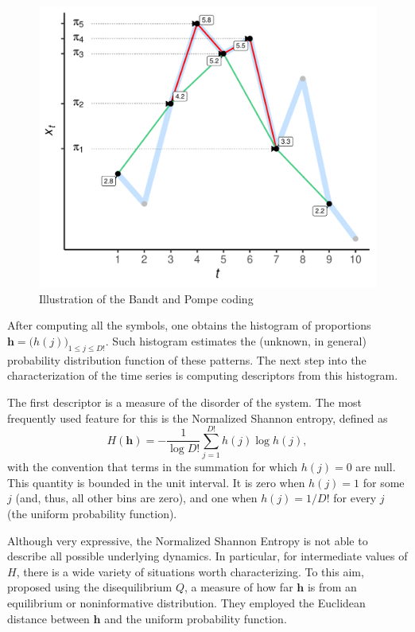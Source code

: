 \documentclass[alpha-refs]{wiley-article}
\begin{document}
\begin{figure}[hbt]
\centering
\includegraphics[width=.7\linewidth]{IntroBP}
\caption{Illustration of the Bandt and Pompe coding}
\label{Fig:IntroBP}
\end{figure}

After computing all the symbols, one obtains the histogram of proportions $\bm h = \big(h(j)\big)_{1\leq j\leq D!}$.
Such histogram estimates the (unknown, in general) probability distribution function of these patterns.
The next step into the characterization of the time series is computing descriptors from this histogram.

The first descriptor is a measure of the disorder of the system.
The most frequently used feature for this is the Normalized Shannon entropy, defined as
\begin{equation}
H(\bm h) = -\frac{1}{\log D!} \sum_{j=1}^{D!} h(j) \log h(j),
\end{equation}
with the convention that terms in the summation for which $h(j)=0$ are null.
This quantity is bounded in the unit interval. 
It is zero when $h(j)=1$ for some $j$ (and, thus, all other bins are zero), and one when $h(j)=1/D!$ for every $j$ (the uniform probability function).

Although very expressive, the Normalized Shannon Entropy is not able to describe all possible underlying dynamics.
In particular, for intermediate values of $H$, there is a wide variety of situations worth characterizing.
To this aim, \citet{LopezRuiz1995} proposed using the disequilibrium  $Q$, a measure of how far $\bm h$ is from an equilibrium or noninformative distribution.
They employed the Euclidean distance between $\bm h$ and the uniform probability function.
\end{document}
